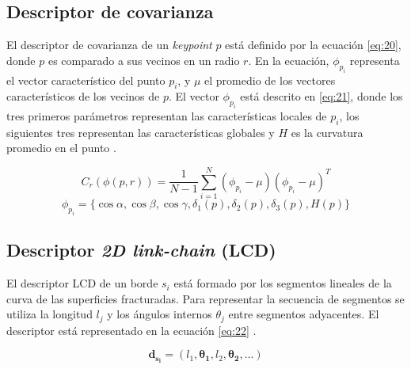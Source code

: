 \subsection{Descriptor de covarianza}
El descriptor de covarianza de un \textit{keypoint} $p$ está definido por la ecuación \ref{eq:20}, donde $p$ es comparado a sus vecinos en un radio $r$. En la ecuación, $\phi_p_i$ representa el vector característico del punto $p_i$, y $\mu$ el promedio de los vectores característicos  de los vecinos de $p$. El vector $\phi_p_i$ está descrito en \ref{eq:21}, donde los tres primeros parámetros representan las características locales de $p_i$, los siguientes tres representan las características globales y $H$ es la curvatura promedio en el punto \cite{6}.

\begin{equation} \label{eq:20}
    C_r (\phi(p, r)) = \frac{1}{N-1} \sum_{i=1}^{N} (\phi_p_i - \mu) (\phi_p_i - \mu)^T
\end{equation}
\begin{equation} \label{eq:21}
    \phi_p_i = \{ \cos{\alpha}, \cos{\beta}, \cos{\gamma}, \delta_1(p), \delta_2(p), \delta_3(p), H(p) \}
\end{equation}


\subsection{Descriptor \textit{2D link-chain} (LCD)}
El descriptor LCD de un borde $s_i$ está formado por los segmentos lineales de la curva de las superficies fracturadas. Para representar la secuencia de segmentos se utiliza la longitud $l_j$ y los ángulos internos $\theta_j$ entre segmentos adyacentes. El descriptor está representado en la ecuación \ref{eq:22} \cite{7}.

\begin{equation} \label{eq:22}
    \mathbf{d_{s_i}} = (l_1, \mathbf{\theta_1}, l_2, \mathbf{\theta_2}, ...)
\end{equation}

